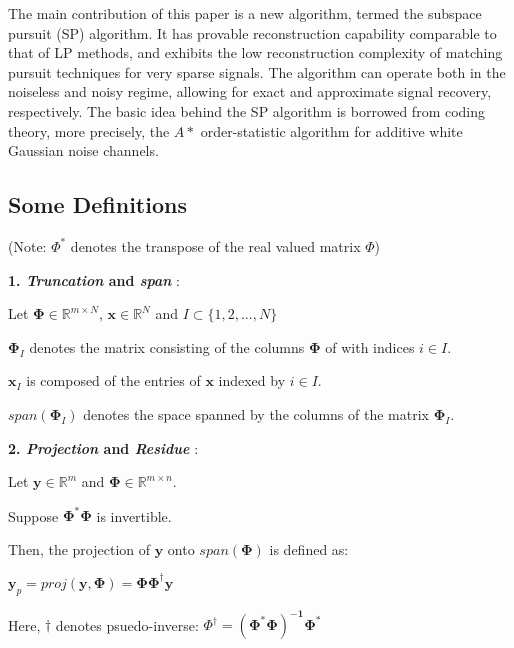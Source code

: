 \documentclass[fleqn, 11pt]{article}
\newcommand{\bs}[1]{\boldsymbol{#1}}
\newcommand{\R}[0]{\mathbb{R}}
\begin{document}
The main contribution of this paper is a new algorithm,
termed the subspace pursuit (SP) algorithm. It has provable
reconstruction capability comparable to that of LP methods,
and exhibits the low reconstruction complexity of matching
pursuit techniques for very sparse signals. The algorithm can
operate both in the noiseless and noisy regime, allowing
for exact and approximate signal recovery, respectively.
The basic idea behind the SP algorithm is borrowed from
coding theory, more precisely, the $A*$ order-statistic algorithm  
for additive white Gaussian noise channels.

\hrulefill

\subsection*{Some Definitions}

(Note: $\Phi^*$ denotes the transpose of the real valued matrix $\Phi$)

\medskip


\textbf{1. \textit{Truncation} and \textit{span} }: 

\smallskip

Let $\bs{\Phi} \in \R^{m \times N}$, $\bs{x} \in \R^N$ and $I \subset \{ 1,2,..., N \} $ 

\smallskip

$\bs{\Phi}_{I}$ denotes the matrix consisting of the columns $\bs{\Phi}$ of with indices $i \in I$. 

\smallskip

$\bs{x}_{I}$ is composed of the entries of $\bs{x}$
indexed by $i \in I$. 

\smallskip

$span(\bs{\Phi}_{I})$ denotes the space spanned by the columns of the matrix $\bs{\Phi}_{I}$.


\bigskip 

\textbf{2. \textit{Projection} and \textit{Residue} }: 

\smallskip

Let $\bs{y} \in \R^m$ and $\bs{\Phi} \in \R^{m \times n}$. 

Suppose  $\bs{\Phi^*\Phi}$ is invertible. 

Then, the projection of $\bs{y}$ onto  $span(\bs{\Phi})$ is defined as:
\begin{center}
    $\bs{y}_p = proj( \bs{y} ,\bs{\Phi}  )  = \bs{\Phi \Phi^{\dagger} y }  $ 
\end{center}

Here, $\dagger$ denotes psuedo-inverse: $\Phi^{\dagger} = \bs{(\Phi^*\Phi)^{-1}\Phi^*}  $
\end{document}
